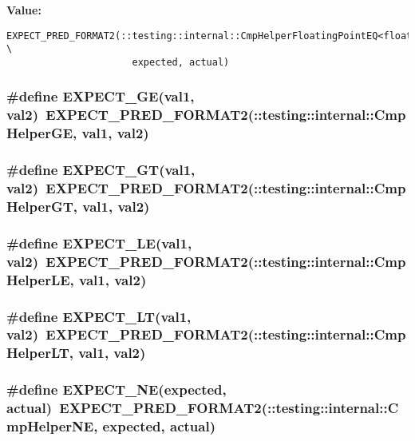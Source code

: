 \textbf{Value:}

\begin{Code}\begin{verbatim}EXPECT_PRED_FORMAT2(::testing::internal::CmpHelperFloatingPointEQ<float>, \
                      expected, actual)
\end{verbatim}
\end{Code}
\subsubsection{\setlength{\rightskip}{0pt plus 5cm}\#define EXPECT\_\-GE(val1, val2)~EXPECT\_\-PRED\_\-FORMAT2(::testing::internal::CmpHelperGE, val1, val2)}\label{gtest_8h_728dbe0c8d6e93c4e5a192b7296a2ab1}


\subsubsection{\setlength{\rightskip}{0pt plus 5cm}\#define EXPECT\_\-GT(val1, val2)~EXPECT\_\-PRED\_\-FORMAT2(::testing::internal::CmpHelperGT, val1, val2)}\label{gtest_8h_21ab104b356bb282b221b95387cf31eb}


\subsubsection{\setlength{\rightskip}{0pt plus 5cm}\#define EXPECT\_\-LE(val1, val2)~EXPECT\_\-PRED\_\-FORMAT2(::testing::internal::CmpHelperLE, val1, val2)}\label{gtest_8h_b390c93c4955deac6112e6653661a0dd}


\subsubsection{\setlength{\rightskip}{0pt plus 5cm}\#define EXPECT\_\-LT(val1, val2)~EXPECT\_\-PRED\_\-FORMAT2(::testing::internal::CmpHelperLT, val1, val2)}\label{gtest_8h_55bda7934729999a4ab79c534b6c24dc}


\subsubsection{\setlength{\rightskip}{0pt plus 5cm}\#define EXPECT\_\-NE(expected, actual)~EXPECT\_\-PRED\_\-FORMAT2(::testing::internal::CmpHelperNE, expected, actual)}\label{gtest_8h_35f03ed1d38bce3c0e3854fe391feca9}


